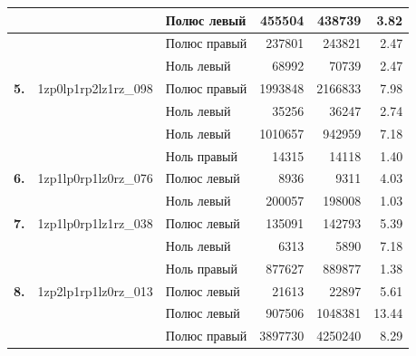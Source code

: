 \begin{table}[htbp]
\begin{threeparttable}
\begin{tabular}{|l|l|l|l|l|l|}
			& & Полюс левый & \multicolumn{1}{r|}{\num{455504}} & \multicolumn{1}{r|}{\num{438739}} & \multicolumn{1}{r|}{\num{3.82}}\\ \hline
			& & Полюс правый & \multicolumn{1}{r|}{\num{237801}} & \multicolumn{1}{r|}{\num{243821}} & \multicolumn{1}{r|}{\num{2.47}}\\ \hline
			& & Ноль левый & \multicolumn{1}{r|}{\num{68992}} & \multicolumn{1}{r|}{\num{70739}} & \multicolumn{1}{r|}{\num{2.47}}\\ \hline
			\textbf{5.} & 1zp0lp1rp2lz1rz\_098 & Полюс правый & \multicolumn{1}{r|}{\num{1993848}} & \multicolumn{1}{r|}{\num{2166833}} & \multicolumn{1}{r|}{\num{7.98}}\\ \hline
			& & Ноль левый & \multicolumn{1}{r|}{\num{35256}} & \multicolumn{1}{r|}{\num{36247}} & \multicolumn{1}{r|}{\num{2.74}}\\ \hline
			& & Ноль левый & \multicolumn{1}{r|}{\num{1010657}} & \multicolumn{1}{r|}{\num{942959}} & \multicolumn{1}{r|}{\num{7.18}}\\ \hline
			& & Ноль правый & \multicolumn{1}{r|}{\num{14315}} & \multicolumn{1}{r|}{\num{14118}} & \multicolumn{1}{r|}{\num{1.40}}\\ \hline
			\textbf{6.} & 1zp1lp0rp1lz0rz\_076 & Полюс левый & \multicolumn{1}{r|}{\num{8936}} & \multicolumn{1}{r|}{\num{9311}} & \multicolumn{1}{r|}{\num{4.03}}\\ \hline
			& & Ноль левый & \multicolumn{1}{r|}{\num{200057}} & \multicolumn{1}{r|}{\num{198008}} & \multicolumn{1}{r|}{\num{1.03}}\\ \hline
			\textbf{7.} & 1zp1lp0rp1lz1rz\_038 & Полюс левый & \multicolumn{1}{r|}{\num{135091}} & \multicolumn{1}{r|}{\num{142793}} & \multicolumn{1}{r|}{\num{5.39}}\\ \hline
			& & Ноль левый & \multicolumn{1}{r|}{\num{6313}} & \multicolumn{1}{r|}{\num{5890}} & \multicolumn{1}{r|}{\num{7.18}}\\ \hline
			& & Ноль правый & \multicolumn{1}{r|}{\num{877627}} & \multicolumn{1}{r|}{\num{889877}} & \multicolumn{1}{r|}{\num{1.38}}\\ \hline
			\textbf{8.} & 1zp2lp1rp1lz0rz\_013 & Полюс левый & \multicolumn{1}{r|}{\num{21613}} & \multicolumn{1}{r|}{\num{22897}} & \multicolumn{1}{r|}{\num{5.61}}\\ \hline
			& & Полюс левый & \multicolumn{1}{r|}{\num{907506}} & \multicolumn{1}{r|}{\num{1048381}} & \multicolumn{1}{r|}{\num{13.44}}\\ \hline
			& & Полюс правый & \multicolumn{1}{r|}{\num{3897730}} & \multicolumn{1}{r|}{\num{4250240}} & \multicolumn{1}{r|}{\num{8.29}}\\ \hline

\end{tabular}
\end{threeparttable}
\end{table}

